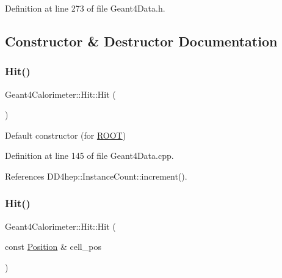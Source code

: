 Definition at line 273 of file Geant4\+Data.\+h.



\subsection{Constructor \& Destructor Documentation}
\hypertarget{class_d_d4hep_1_1_simulation_1_1_geant4_calorimeter_1_1_hit_aa82fe18c0b10841fcba68e73c2efd0b0}{}\label{class_d_d4hep_1_1_simulation_1_1_geant4_calorimeter_1_1_hit_aa82fe18c0b10841fcba68e73c2efd0b0} 
\subsubsection{\texorpdfstring{Hit()}{Hit()}\hspace{0.1cm}{\footnotesize\ttfamily [1/2]}}
{\footnotesize\ttfamily Geant4\+Calorimeter\+::\+Hit\+::\+Hit (\begin{DoxyParamCaption}{ }\end{DoxyParamCaption})}



Default constructor (for \hyperlink{namespace_r_o_o_t}{R\+O\+OT}) 



Definition at line 145 of file Geant4\+Data.\+cpp.



References D\+D4hep\+::\+Instance\+Count\+::increment().

\hypertarget{class_d_d4hep_1_1_simulation_1_1_geant4_calorimeter_1_1_hit_ac32b075818d49af9ee0a119877c68980}{}\label{class_d_d4hep_1_1_simulation_1_1_geant4_calorimeter_1_1_hit_ac32b075818d49af9ee0a119877c68980} 
\subsubsection{\texorpdfstring{Hit()}{Hit()}\hspace{0.1cm}{\footnotesize\ttfamily [2/2]}}
{\footnotesize\ttfamily Geant4\+Calorimeter\+::\+Hit\+::\+Hit (\begin{DoxyParamCaption}\item[{const \hyperlink{namespace_d_d4hep_1_1_geometry_a55083902099d03506c6db01b80404900}{Position} \&}]{cell\+\_\+pos }\end{DoxyParamCaption})}



